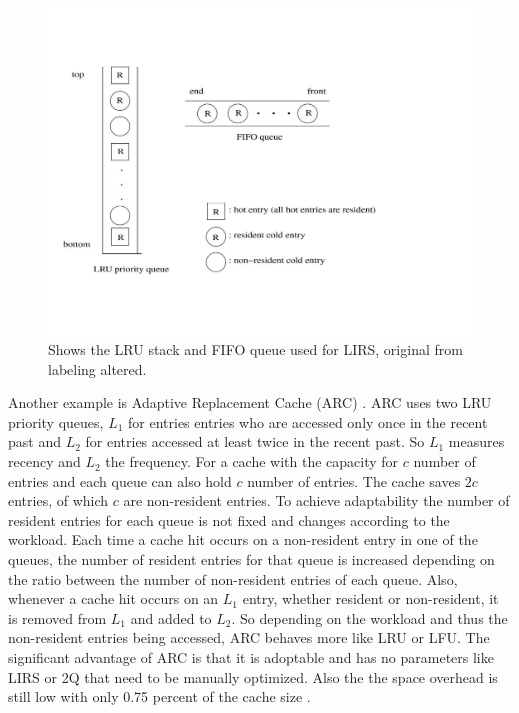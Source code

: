 \documentclass[
	12pt,
	a4paper,
	abstract,
	bibliography=totoc,
	chapterprefix,
	headings=openright,
	numbers=endperiod,
	parskip=half,
	twoside,
]{scrreprt}
\begin{document}
\begin{figure}[ht]
	\centering
	\includegraphics[scale=0.5]{lirs_queues.jpg}
	\caption{Shows the LRU stack and FIFO queue used for LIRS, original from \cite{10.1145/511399.511340} labeling  altered.}
		\label{fig:lirs queues}
\end{figure}


Another example is Adaptive Replacement Cache (ARC) \cite{270366}.
ARC uses two LRU priority queues, $L_1$ for entries entries who are accessed only once in the recent past and $L_2$ for entries accessed at least twice in the recent past.
So $L_1$ measures recency and $L_2$ the frequency.
For a cache with the capacity for $c$ number of entries and each queue can also hold $c$ number of entries.
The cache saves $2c$ entries, of which $c$ are non-resident entries.
To achieve adaptability the number of resident entries for each queue is not fixed and changes according to the workload.
Each time a cache hit occurs on a non-resident entry in one of the queues, the number of resident entries for that queue is increased
depending on the ratio between the number of non-resident entries of each queue.
Also, whenever a cache hit occurs on an $L_1$ entry, whether resident or non-resident, it is removed from $L_1$ and added to $L_2$.
So depending on the workload and thus the non-resident entries being accessed, ARC behaves more like LRU or LFU.
The significant advantage of ARC is that it is adoptable and has no parameters like LIRS or 2Q that need to be manually optimized.
Also the the space overhead is still low with only 0.75 percent of the cache size \cite{megiddo2004outperforming}.
\end{document}
